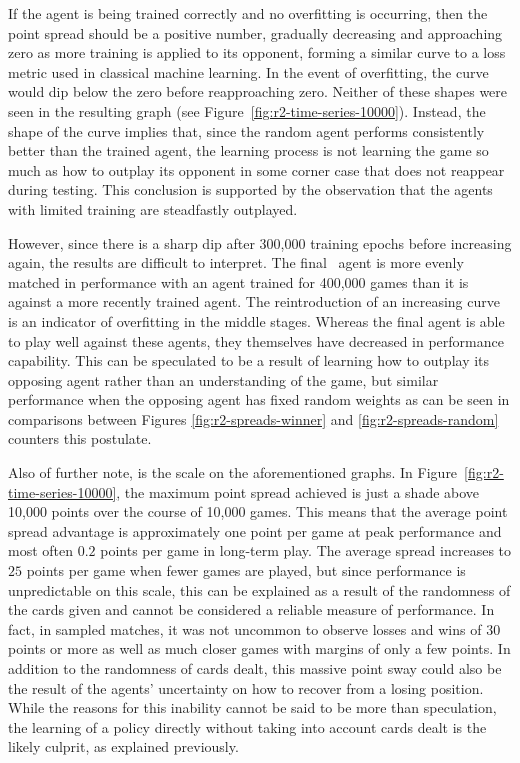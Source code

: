 If the agent is being trained correctly and no overfitting is occurring,
then the point spread should be a positive number,
gradually decreasing and approaching zero
as more training is applied to its opponent,
forming a similar curve to a loss metric used in classical machine learning.
%
In the event of overfitting,
the curve would dip below the zero before reapproaching zero.
%
Neither of these shapes were seen in the resulting graph
(see Figure~\ref{fig:r2-time-series-10000}).
%
Instead,
the shape of the curve implies that,
since the random agent performs consistently better than the trained agent,
the learning process is not learning the game so much as how to outplay its
opponent in some corner case that does not reappear during testing.
%
This conclusion is supported by the observation that the agents with limited
training are steadfastly outplayed.

However,
since there is a sharp dip after 300,000 training epochs before increasing
again,
the results are difficult to interpret.
%
The final \learned\ agent is more evenly matched in performance with an agent
trained for 400,000 games
than it is against a more recently trained agent.
%
The reintroduction of an increasing curve
is an indicator of overfitting in the middle stages.
%
Whereas the final agent is able to play well against these agents,
they themselves have decreased in performance capability.
%
This can be speculated to be a result of learning how to outplay its opposing agent
rather than an understanding of the game,
but similar performance when the opposing agent
has fixed random weights\textemdash
as can be seen in comparisons between Figures
\ref{fig:r2-spreads-winner} and \ref{fig:r2-spreads-random}\textemdash
counters this postulate.

Also of further note, is the scale on the aforementioned graphs.
%
In Figure~\ref{fig:r2-time-series-10000},
the maximum point spread achieved is just a shade above 10,000 points
over the course of 10,000 games.
%
This means that the average point spread advantage is approximately 
one point per game at peak performance\textemdash
and most often $0.2$ points per game\textemdash
in long-term play.
%
The average spread increases to $25$ points per game when fewer games are 
played,
but since performance is unpredictable on this scale,
this can be explained as a result of the randomness of the cards given
and cannot be considered a reliable measure of performance.
%
In fact,
in sampled matches,
it was not uncommon to observe losses and wins of 30 points or more
as well as much closer games with margins of only a few points.
%
In addition to the randomness of cards dealt,
this massive point sway could also be the result of the agents' uncertainty on 
how to recover from a losing position.
%
While the reasons for this inability cannot be said to be more than speculation,
the learning of a policy directly without taking into account cards dealt
is the likely culprit,
as explained previously.

